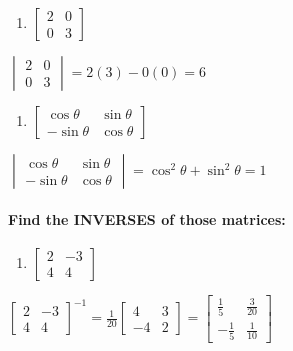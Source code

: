 \documentclass[
  letterpaper,
  DIV=11,
  numbers=noendperiod]{scrartcl}
\let\oldparagraph\paragraph
\renewcommand{\paragraph}[1]{\oldparagraph{#1}\mbox{}}
\providecommand{\tightlist}{%
  \setlength{\itemsep}{0pt}\setlength{\parskip}{0pt}}\usepackage{longtable,booktabs,array}
\begin{document}
\begin{enumerate}
\def\labelenumi{\arabic{enumi})}
\setcounter{enumi}{1}
\tightlist
\item
  \(\begin{bmatrix}2 & 0 \\ 0 & 3 \end{bmatrix}\)
\end{enumerate}

\(\begin{vmatrix}2 & 0 \\ 0 & 3 \end{vmatrix} = 2(3)-0(0) = 6\)

\begin{enumerate}
\def\labelenumi{\arabic{enumi})}
\setcounter{enumi}{2}
\tightlist
\item
  \(\begin{bmatrix}\cos\theta & \sin\theta \\ -\sin\theta & \cos\theta \end{bmatrix}\)
\end{enumerate}

\(\begin{vmatrix}\cos\theta & \sin\theta \\ -\sin\theta & \cos\theta \end{vmatrix} = \cos^2\theta + \sin^2\theta = 1\)

\hypertarget{find-the-inverses-of-those-matrices}{%
\paragraph{Find the INVERSES of those
matrices:}\label{find-the-inverses-of-those-matrices}}

\begin{enumerate}
\def\labelenumi{\arabic{enumi})}
\tightlist
\item
  \(\begin{bmatrix}2 & -3 \\ 4 & 4 \end{bmatrix}\)
\end{enumerate}

\(\begin{bmatrix}2 & -3 \\ 4 & 4 \end{bmatrix}^{-1} = \frac{1}{20}\begin{bmatrix}4 & 3 \\ -4 & 2 \end{bmatrix}=\begin{bmatrix}\frac{1}{5} & \frac{3}{20} \\ -\frac{1}{5} & \frac{1}{10}\end{bmatrix}\)
\end{document}
